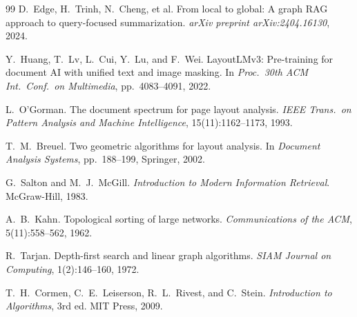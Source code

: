 \documentclass[12pt,a4paper,twoside,openright]{report}
\begin{document}
\begin{thebibliography}{99}
D.~Edge, H.~Trinh, N.~Cheng, et al.
From local to global: A graph RAG approach to query-focused summarization.
\textit{arXiv preprint arXiv:2404.16130}, 2024.

Y.~Huang, T.~Lv, L.~Cui, Y.~Lu, and F.~Wei.
LayoutLMv3: Pre-training for document AI with unified text and image masking.
In \textit{Proc.\ 30th ACM Int.\ Conf.\ on Multimedia}, pp.~4083--4091, 2022.

L.~O'Gorman.
The document spectrum for page layout analysis.
\textit{IEEE Trans.\ on Pattern Analysis and Machine Intelligence}, 15(11):1162--1173, 1993.

T.~M.~Breuel.
Two geometric algorithms for layout analysis.
In \textit{Document Analysis Systems}, pp.~188--199, Springer, 2002.

G.~Salton and M.~J.~McGill.
\textit{Introduction to Modern Information Retrieval}.
McGraw-Hill, 1983.

A.~B.~Kahn.
Topological sorting of large networks.
\textit{Communications of the ACM}, 5(11):558--562, 1962.

R.~Tarjan.
Depth-first search and linear graph algorithms.
\textit{SIAM Journal on Computing}, 1(2):146--160, 1972.

T.~H.~Cormen, C.~E.~Leiserson, R.~L.~Rivest, and C.~Stein.
\textit{Introduction to Algorithms}, 3rd ed.
MIT Press, 2009.

\end{thebibliography}
\end{document}
